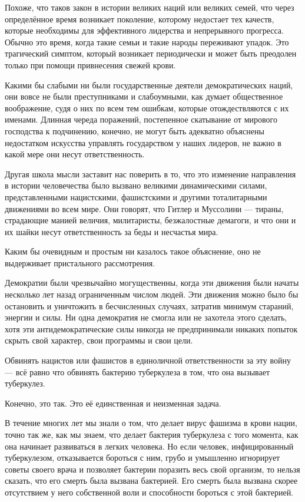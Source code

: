 Похоже, что таков закон в истории великих наций или великих семей, что через определённое время возникает поколение, которому недостает тех качеств, которые необходимы для эффективного лидерства и непрерывного прогресса. Обычно это время, когда такие семьи и такие народы переживают упадок. Это трагический симптом, который возникает периодически и может быть преодолен только при помощи привнесения свежей крови.

Какими бы слабыми ни были государственные деятели демократических наций, они вовсе не были преступниками и слабоумными, как думает общественное воображение, судя о них по всем тем ошибкам, которые отождествляются с их именами. Длинная череда поражений, постепенное скатывание от мирового господства к подчинению, конечно, не могут быть адекватно объяснены недостатком искусства управлять государством у наших лидеров, не важно в какой мере они несут ответственность.

Другая школа мысли заставит нас поверить в то, что это изменение направления в истории человечества было вызвано великими динамическими силами, представленными нацистскими, фашистскими и другими тоталитарными движениями во всем мире. Они говорят, что Гитлер и Муссолини — тираны, страдающие манией величия, милитаристы, безжалостные демагоги, и что они и их шайки несут ответственность за беды и несчастья мира.

Каким бы очевидным и простым ни казалось такое объяснение, оно не выдерживает пристального рассмотрения.

Демократии были чрезвычайно могущественны, когда эти движения были начаты несколько лет назад ограниченным числом людей. Эти движения можно было бы остановить и уничтожить в бесчисленных случаях, затратив минимум стараний, энергии и силы. Ни одна демократия не смогла или не захотела этого сделать, хотя эти антидемократические силы никогда не предпринимали никаких попыток скрыть свой характер, свои программы и свои цели.

Обвинять нацистов или фашистов в единоличной ответственности за эту войну — всё равно что обвинять бактерию туберкулеза в том, что она вызывает туберкулез.

Конечно, это так. Это её единственная и неизменная задача.

В течение многих лет мы знали о том, что делает вирус фашизма в крови нации, точно так же, как мы знаем, что делает бактерия туберкулеза с того момента, как она начинает развиваться в легких человека. Но если человек, инфицированный туберкулезом, отказывается бороться с ним, грубо и умышленно игнорирует советы своего врача и позволяет бактерии поразить весь свой организм, то нельзя сказать, что его смерть была вызвана бактерией. Его смерть была вызвана скорее отсутствием у него собственной воли и способности бороться с этой бактерией.

